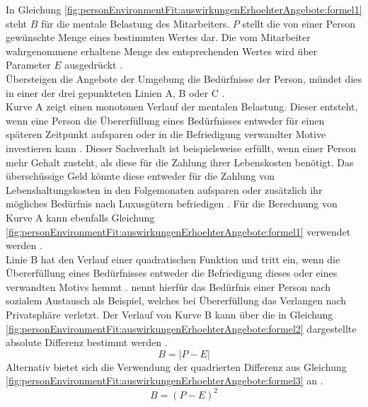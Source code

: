 In Gleichung \ref{fig:personEnvironmentFit:auswirkungenErhoehterAngebote:formel1} steht $B$ für die mentale Belastung des Mitarbeiters. $P$ stellt die von einer Person gewünschte Menge eines bestimmten Wertes dar. Die vom Mitarbeiter wahrgenommene erhaltene Menge des entsprechenden Wertes wird über Parameter $E$ ausgedrückt \cite[S. 2]{edwards:1993}.\\
Übersteigen die Angebote der Umgebung die Bedürfnisse der Person, mündet dies in einer der drei gepunkteten Linien A, B oder C \cite{mechanismsOfJobStressAndStrain:1982}.\\
Kurve A zeigt einen monotonen Verlauf der mentalen Belastung. Dieser entsteht, wenn eine Person die Übererfüllung eines Bedürfnisses entweder für einen späteren Zeitpunkt aufsparen oder in die Befriedigung verwandter Motive investieren kann \cite{mechanismsOfJobStressAndStrain:1982}. Dieser Sachverhalt ist beispielsweise erfüllt, wenn einer Person mehr Gehalt zusteht, als diese für die Zahlung ihrer Lebenskosten benötigt. Das überschüssige Geld könnte diese entweder für die Zahlung von Lebenshaltungskosten in den Folgemonaten aufsparen oder zusätzlich ihr mögliches Bedürfnis nach Luxusgütern befriedigen \cite[S. 21]{edwards:2008}. Für die Berechnung von Kurve A kann ebenfalls Gleichung \ref{fig:personEnvironmentFit:auswirkungenErhoehterAngebote:formel1} verwendet werden \cite[S. 2]{edwards:1993}.\\
Linie B hat den Verlauf einer quadratischen Funktion und tritt ein, wenn die Übererfüllung eines Bedürfnisses entweder die Befriedigung dieses oder eines verwandten Motivs hemmt \cite[S. 5]{caplan:1987}. \textcite{harrison:1978} nennt hierfür das Bedürfnis einer Person nach sozialem Austausch als Beispiel, welches bei Übererfüllung das Verlangen nach Privatsphäre verletzt. Der Verlauf von Kurve B kann über die in Gleichung \ref{fig:personEnvironmentFit:auswirkungenErhoehterAngebote:formel2} dargestellte absolute Differenz bestimmt werden \cite[S. 2]{edwards:1993}.
\begin{equation}
	B = |P - E|
	\label{fig:personEnvironmentFit:auswirkungenErhoehterAngebote:formel2}
\end{equation}
Alternativ bietet sich die Verwendung der quadrierten Differenz aus Gleichung \ref{fig:personEnvironmentFit:auswirkungenErhoehterAngebote:formel3} an \cite[S. 2]{edwards:1993}.
\begin{equation}
	B = (P - E)^2
	\label{fig:personEnvironmentFit:auswirkungenErhoehterAngebote:formel3}
\end{equation}
